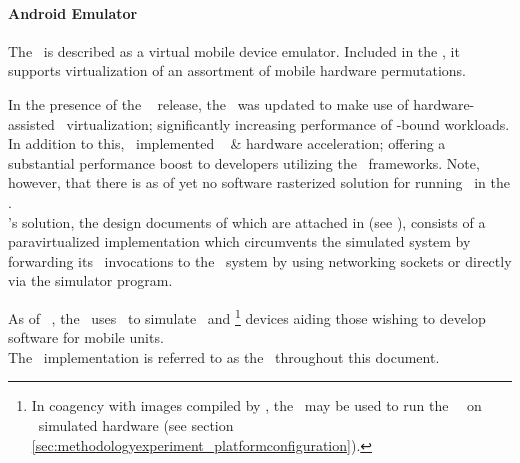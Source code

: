 \paragraph{Android Emulator}
\label{par:relatedwork_qemu_androidemulator}
The \dvttermandroidemulator\ is described as a virtual mobile device emulator.
Included in the \dvttermandroidsdk , it supports virtualization of an assortment of mobile hardware permutations.

In the presence of the \dvttermandroid\  release, the \dvttermandroidsdk\ was updated to make use of hardware-assisted \dvttermxeightysix\ virtualization; significantly increasing performance of \dvttermcpu -bound workloads.
In addition to this, \dvttermgoogle\ implemented \dvttermopengles\  \&  hardware acceleration; offering a substantial performance boost to developers utilizing the \dvttermopengles\ frameworks.
Note, however, that there is as of yet no software rasterized solution for running \dvttermopenglestwopointo\ in the \dvttermandroidemulator .\\

\noindent
\dvttermgoogle 's solution, the design documents of which are attached in  (see ), consists of a paravirtualized implementation which circumvents the simulated system by forwarding its \dvttermopengles\ invocations to the \dvttermhost\ system by using networking sockets or directly via the simulator program.

As of \dvttermandroid\ , the \dvttermandroidemulator\ uses \dvttermqemu\ to simulate \dvttermarm\ and \dvttermxeightysix \footnote{In coagency with images compiled by \dvttermintel , the \dvttermandroidemulator\ may be used to run the \dvttermandroid\ \dvttermos\ on \dvttermxeightysix\ simulated hardware (see section \ref{sec:methodologyexperiment_platformconfiguration}).} devices aiding those wishing to develop software for mobile units.\\

\noindent
The \dvttermandroidemulator\ implementation is referred to as the \dvttermreferencesolution\ throughout this document.
